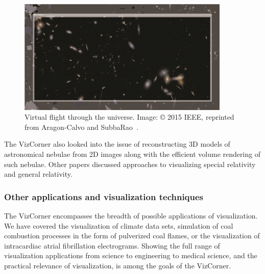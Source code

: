 \documentclass[10pt,journal,compsoc]{IEEEtran}
\begin{document}
\begin{figure}
    \begin{center}    
        \includegraphics[width=0.9\textwidth]{galaxies.png}
        \caption{Virtual flight through the universe. 
 Image: \copyright{} 2015 IEEE, reprinted from Aragon-Calvo and SubbaRao~\cite{Aragon-Calvo2015}.
  \label{fig:galaxies}}        
    \end{center}
\end{figure}

The VizCorner also looked into the issue of reconstructing 3D models of astronomical nebulae from 2D images along with the efficient volume rendering of such nebulae. Other papers discussed approaches to visualizing special relativity and general relativity. 


\subsubsection{Other applications and visualization techniques}

The VizCorner encompasses the breadth of possible applications of visualization. We have covered the visualization of climate data sets, simulation of coal combustion processes in the form of pulverized coal flames, or the visualization of intracardiac atrial fibrillation electrograms. Showing the full range of visualization applications from science to engineering to medical science, and the practical relevance of visualization, is among the goals of the VizCorner. 
\end{document}
